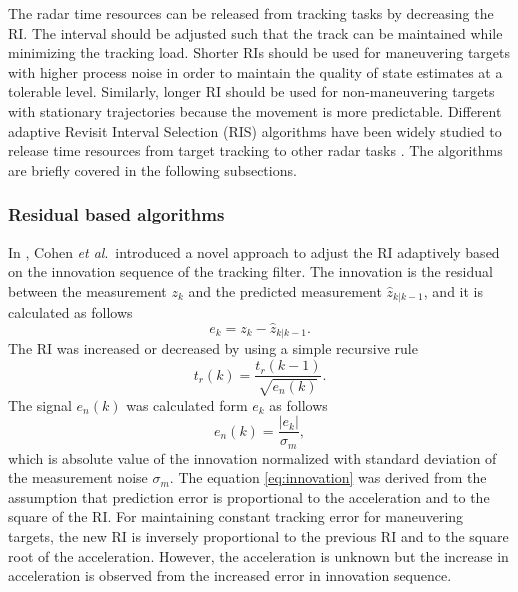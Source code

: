 \documentclass[english, 12pt, a4paper, elec, utf8, a-1b, online]{aaltothesis}
\newcommand{\etal}{\textit{et al}.~}
\newcommand{\ri}{t_r}
\begin{document}
The radar time resources can be released from tracking tasks by decreasing the RI. 
The interval should be adjusted such that the track can be maintained while minimizing the tracking load.
Shorter RIs should be used for maneuvering targets with higher process noise in order to maintain the quality of state estimates at a tolerable level. 
Similarly, longer RI should be used for non-maneuvering targets with stationary trajectories because the movement is more predictable.
Different adaptive Revisit Interval Selection (RIS) algorithms have been widely studied to release time resources from target tracking to other radar tasks \cite{Cohen1986, Gardner1988, Munu1992, ChengTing2007, Baek2010, Watson1993, Charlish2015, Keuk1975, Shin1995, Benoudnine2006}.
The algorithms are briefly covered in the following subsections.

\subsubsection{Residual based algorithms}

In \cite{Cohen1986}, Cohen \etal introduced a novel approach to adjust the RI adaptively based on the innovation sequence of the tracking filter.
The innovation is the residual between the measurement $z_k$ and the predicted measurement $\hat{z}_{k|k-1}$, and it is calculated as follows
\begin{equation}\label{eq:innovation}
    e_k = z_k - \hat{z}_{k|k-1}.
\end{equation}
The RI was increased or decreased by using a simple recursive rule 
\begin{equation}\label{eq:update_resid}
    \ri(k) = \frac{\ri(k-1)}{\sqrt{e_n(k)}}.
\end{equation}
The signal $e_n(k)$ was calculated form $e_k$ as follows
\begin{equation}\label{eq:norm_residual}
    e_n(k) = \frac{|e_k|}{\sigma_m},
\end{equation}
which is absolute value of the innovation normalized with standard deviation of the measurement noise $\sigma_m$.
The equation \eqref{eq:innovation} was derived from the assumption that prediction error is proportional to the acceleration and to the square of the RI.
For maintaining constant tracking error for maneuvering targets, the new RI is inversely proportional to the previous RI and to the square root of the acceleration.
However, the acceleration is unknown but the increase in acceleration is observed from the increased error in innovation sequence.
\end{document}

